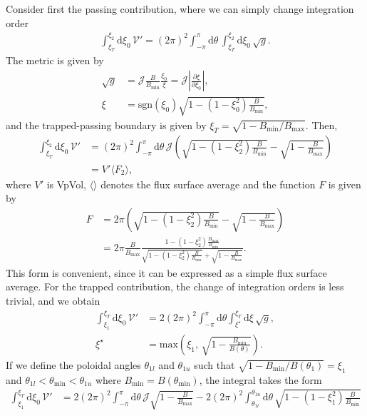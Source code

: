 \documentclass[11pt,a4paper]{article}
\newcommand{\rd}{\ensuremath{\mathrm{d}}}
\newcommand{\sub}[1]{\ensuremath{_{\text{#1}}}}
\begin{document}
Consider first the passing contribution, where we can simply change integration order
\begin{align}
\int_{\xi_T}^{\xi_2} \rd \xi_0 \, \mathcal{V}' = (2\pi)^2 \int_{-\pi}^\pi \rd \theta \, \int_{\xi_T}^{\xi_2} \rd \xi_0 \, \sqrt{g}.
\end{align}
The metric is given by
\begin{align}
\sqrt{g} &= \mathcal{J}\frac{B}{B\sub{min}}\frac{\xi_0}{\xi} = \mathcal{J}\left|\frac{\partial \xi}{\partial \xi_0}\right|, \\
\xi &= \text{sgn}(\xi_0)\sqrt{1-(1-\xi_0^2)\frac{B}{B\sub{min}}},
\end{align}
and the trapped-passing boundary is given by $\xi_T = \sqrt{1-B\sub{min}/B\sub{max}}$. Then,
\begin{align}
\int_{\xi_T}^{\xi_2} \rd \xi_0 \, \mathcal{V}' &= (2\pi)^2 \int_{-\pi}^{\pi} \rd \theta \, \mathcal{J} \left( \sqrt{ 1 - (1-\xi_2^2)\frac{B}{B\sub{min}}} - \sqrt{1-\frac{B}{B\sub{max}}}  \right) \nonumber \\
&= V' \langle F_2\rangle,
\end{align}
where $V'$ is VpVol, $\langle \rangle$ denotes the flux surface average and the function $F$ is given by
\begin{align}
F &= 2\pi \left( \sqrt{ 1 - (1-\xi_2^2)\frac{B}{B\sub{min}}} - \sqrt{1-\frac{B}{B\sub{max}}} \right) \nonumber \\
&= 2\pi \frac{B}{B\sub{max}} \frac{ 1 - (1-\xi_2^2)\frac{B\sub{max}}{B\sub{min}} }{ \sqrt{ 1 - (1-\xi_2^2)\frac{B}{B\sub{min}}} + \sqrt{1-\frac{B}{B\sub{max}}} }.
\end{align}
This form is convenient, since it can be expressed as a simple flux surface average. For the trapped contribution, the change of integration orders is less trivial, and we obtain
\begin{align}
\int_{\xi_1}^{\xi_T}\rd\xi_0 \,\mathcal{V}' &= 2(2\pi)^2 \int_{-\pi}^\pi \rd \theta \int_{\xi^\star}^{\xi_T} \rd \xi \, \sqrt{g}, \nonumber \\
\xi^\star &= \text{max}\left(\xi_1, \, \sqrt{1-\frac{B\sub{min}}{B(\theta)}}\right).
\end{align}
If we define the poloidal angles $\theta_{1l}$ and $\theta_{1u}$ such that $\sqrt{1-B\sub{min}/B(\theta_1)} = \xi_1$ and $\theta_{1l} < \theta\sub{min} < \theta_{1u}$ where $B\sub{min} = B(\theta\sub{min})$, the integral takes the form
\begin{align}
\int_{\xi_1}^{\xi_T}\rd\xi_0 \,\mathcal{V}' &=  2(2\pi)^2 \int_{-\pi}^\pi \rd \theta \,\mathcal{J}\sqrt{1-\frac{B}{B\sub{max}}} - 2(2\pi)^2 \int_{\theta_{1l}}^{\theta_{1u}}\rd \theta \, \sqrt{ 1 - (1-\xi_1^2)\frac{B}{B\sub{min}}}
\end{align}
\end{document}
